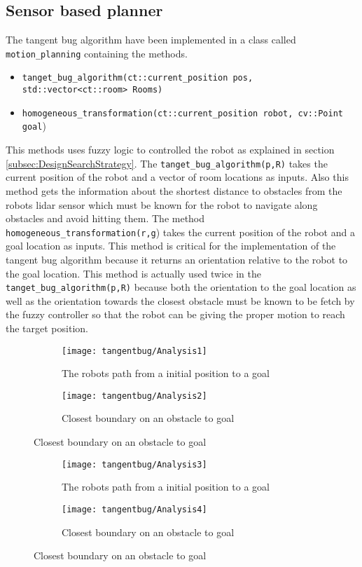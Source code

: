 \documentclass[../Head/Main.tex]{subfiles}
\begin{document}
\subsection{Sensor based planner}
\label{subsec:tangentBug}
The tangent bug algorithm have been implemented in a class called \texttt{motion\_planning} containing the methods.
\begin{itemize}
	\item \texttt{tanget\_bug\_algorithm(ct::current\_position pos, std::vector<ct::room> Rooms)}
	\item \texttt{homogeneous\_transformation(ct::current\_position robot, cv::Point goal})
\end{itemize}
This methods uses fuzzy logic to controlled the robot as explained in section \ref{subsec:DesignSearchStrategy}. The \texttt{tanget\_bug\_algorithm(p,R)} takes the current position of the robot and a vector of room locations as inputs. Also this method gets the information about the shortest distance to obstacles from the robots lidar sensor which must be known for the robot to navigate along obstacles and avoid hitting them. The method \texttt{homogeneous\_transformation(r,g}) takes the current position of the robot and a goal location as inputs. This method is critical for the implementation of the tangent bug algorithm because it returns an orientation relative to the robot to the goal location. This method is actually used twice in the \texttt{tanget\_bug\_algorithm(p,R)} because both the orientation to the goal location as well as the orientation towards the closest obstacle must be known to be fetch by the fuzzy controller so that the robot can be giving the proper motion to reach the target position. 

\begin{figure}[H]
  \begin{subfigure}[b]{0.59\textwidth}
    \centering
    \texttt{[image: tangentbug/Analysis1]}
    \caption{The robots path from a initial position to a goal}
    \label{fig:tangentBugRobotPath1}
  \end{subfigure}
  \hfill
   \begin{subfigure}[b]{0.39\textwidth}
    \centering
    \texttt{[image: tangentbug/Analysis2]}
    \caption{Closest boundary on an obstacle to goal}
    \label{fig:closestBoundaryOnObstacle1}
  \end{subfigure}
  \end{figure}
  
\begin{figure}[H]
  \begin{subfigure}[b]{0.59\textwidth}
    \centering
    \texttt{[image: tangentbug/Analysis3]}
    \caption{The robots path from a initial position to a goal}
    \label{fig:tangentBugRobotPath2}
  \end{subfigure}
  \hfill
   \begin{subfigure}[b]{0.39\textwidth}
    \centering
    \texttt{[image: tangentbug/Analysis4]}
    \caption{Closest boundary on an obstacle to goal}
    \label{fig:closestBoundaryOnObstacle2}
  \end{subfigure}
  \end{figure}
  
\end{document}
